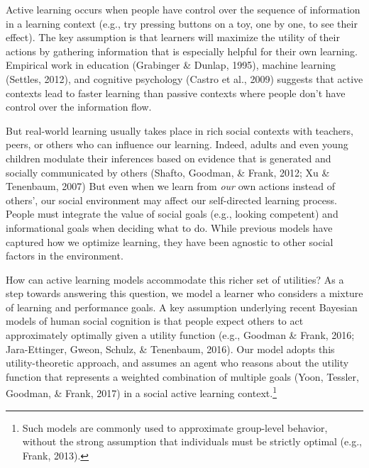 \documentclass[10pt, letterpaper]{article}
\begin{document}
Active learning occurs when people have control over the sequence of
information in a learning context (e.g., try pressing buttons on a toy,
one by one, to see their effect). The key assumption is that learners
will maximize the utility of their actions by gathering information that
is especially helpful for their own learning. Empirical work in
education (Grabinger \& Dunlap, 1995), machine learning (Settles, 2012),
and cognitive psychology (Castro et al., 2009) suggests that active
contexts lead to faster learning than passive contexts where people
don't have control over the information flow.

But real-world learning usually takes place in rich social contexts with
teachers, peers, or others who can influence our learning. Indeed,
adults and even young children modulate their inferences based on
evidence that is generated and socially communicated by others (Shafto,
Goodman, \& Frank, 2012; Xu \& Tenenbaum, 2007) But even when we learn
from \emph{our} own actions instead of others', our social environment
may affect our self-directed learning process. People must integrate the
value of social goals (e.g., looking competent) and informational goals
when deciding what to do. While previous models have captured how we
optimize learning, they have been agnostic to other social factors in
the environment.

How can active learning models accommodate this richer set of utilities?
As a step towards answering this question, we model a learner who
considers a mixture of learning and performance goals. A key assumption
underlying recent Bayesian models of human social cognition is that
people expect others to act approximately optimally given a utility
function (e.g., Goodman \& Frank, 2016; Jara-Ettinger, Gweon, Schulz, \&
Tenenbaum, 2016). Our model adopts this utility-theoretic approach, and
assumes an agent who reasons about the utility function that represents
a weighted combination of multiple goals (Yoon, Tessler, Goodman, \&
Frank, 2017) in a social active learning context.\footnote{Such models
  are commonly used to approximate group-level behavior, without the
  strong assumption that individuals must be strictly optimal (e.g.,
  Frank, 2013).}
\end{document}
